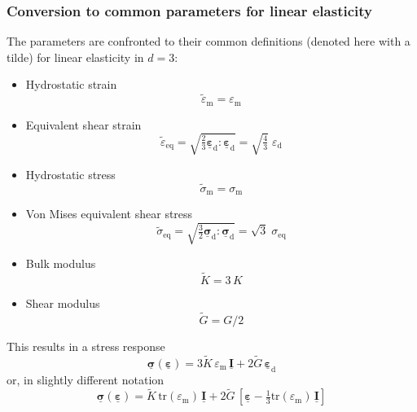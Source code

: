 \documentclass[times,namecite]{goose-article}
\newcommand\T[1]{\underline{\bm{{#1}}}}
\begin{document}
\subsubsection{Conversion to common parameters for linear elasticity}

The parameters are confronted to their common definitions (denoted here with a tilde) for linear elasticity in $d = 3$:

\begin{itemize}
  \item Hydrostatic strain
  \begin{equation}
    \tilde{\varepsilon}_\mathrm{m} = \varepsilon_\mathrm{m}
  \end{equation}
  \item Equivalent shear strain
  \begin{equation}
    \tilde{\varepsilon}_\mathrm{eq}
    = \sqrt{\tfrac{2}{3} \T{\varepsilon}_\mathrm{d} : \T{\varepsilon}_\mathrm{d} }
    = \sqrt{\tfrac{4}{3}} \; \varepsilon_\mathrm{d}
  \end{equation}
  \item Hydrostatic stress
  \begin{equation}
    \tilde{\sigma}_\mathrm{m} = \sigma_\mathrm{m}
  \end{equation}
  \item Von Mises equivalent shear stress
  \begin{equation}
    \tilde{\sigma}_\mathrm{eq}
    = \sqrt{\tfrac{3}{2} \T{\sigma}_\mathrm{d} : \T{\sigma}_\mathrm{d} }
    = \sqrt{3} \; \sigma_\mathrm{eq}
  \end{equation}
  \item Bulk modulus
  \begin{equation}
    \tilde{K} = 3 \, K
  \end{equation}
  \item Shear modulus
  \begin{equation}
    \tilde{G} = G / 2
  \end{equation}
\end{itemize}
This results in a stress response
\begin{equation}
  \T{\sigma} ( \T{\varepsilon} )
  =
  3 \tilde{K} \, \varepsilon_\mathrm{m} \, \T{I}
  +
  2 \tilde{G} \, \T{\varepsilon}_\mathrm{d}
\end{equation}
or, in slightly different notation
\begin{equation}
  \T{\sigma} ( \T{\varepsilon} )
  =
  \tilde{K} \, \text{tr} \left( \varepsilon_\mathrm{m} \right) \, \T{I}
  +
  2 \tilde{G} \, \left[ \T{\varepsilon} - \tfrac{1}{3} \text{tr} \left( \varepsilon_\mathrm{m} \right) \, \T{I} \right]
\end{equation}
\end{document}
